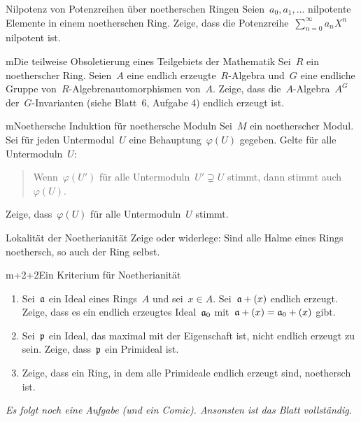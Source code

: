 \documentclass[entwurf]{uebblatt}
\begin{document}

\begin{aufgabe}{2}{Nilpotenz von Potenzreihen über noetherschen Ringen}
Seien~$a_0, a_1, \ldots$ nilpotente Elemente in einem noetherschen Ring. Zeige,
dass die Potenzreihe~$\sum_{n=0}^\infty a_n X^n$ nilpotent ist.
\end{aufgabe}

\begin{aufgabe}{m}{Die teilweise Obsoletierung eines Teilgebiets der Mathematik}
Sei~$R$ ein noetherscher Ring. Seien~$A$ eine
endlich erzeugte~$R$-Algebra und~$G$ eine endliche Gruppe von~$R$-Algebrenautomorphismen
von~$A$. Zeige, dass die~$A$-Algebra~$A^G$ der~$G$-Invarianten (siehe Blatt~6,
Aufgabe 4) endlich erzeugt ist.
\end{aufgabe}

\begin{aufgabe}{m}{Noethersche Induktion für noethersche Moduln}
Sei~$M$ ein noetherscher Modul. Sei für jeden Untermodul~$U$ eine
Behauptung~$\varphi(U)$ gegeben. Gelte für alle Untermoduln~$U$:
\begin{quote}Wenn~$\varphi(U')$ für alle Untermoduln~$U'
\supsetneq U$ stimmt, dann stimmt auch~$\varphi(U)$.\end{quote}
Zeige, dass~$\varphi(U)$ für alle Untermoduln~$U$ stimmt.
\end{aufgabe}

\begin{aufgabe}{2}{Lokalität der Noetherianität}
Zeige oder widerlege: Sind alle Halme eines Rings noethersch, so auch der Ring
selbst.
\end{aufgabe}

\begin{aufgabe}{m+2+2}{Ein Kriterium für Noetherianität}
\begin{enumerate}
\item Sei~$\mathfrak{a}$ ein Ideal eines Rings~$A$ und sei~$x \in A$. Sei~$\mathfrak{a} + (x)$
endlich erzeugt. Zeige, dass es ein endlich erzeugtes Ideal~$\mathfrak{a}_0$ mit~$\mathfrak{a}
+ (x) = \mathfrak{a}_0 + (x)$ gibt.
\item Sei~$\mathfrak{p}$ ein Ideal, das maximal mit der Eigenschaft ist,
nicht endlich erzeugt zu sein. Zeige, dass~$\mathfrak{p}$ ein Primideal ist.
\item Zeige, dass ein Ring, in dem alle Primideale endlich erzeugt sind,
noethersch ist.
\end{enumerate}
\end{aufgabe}

\centering
\emph{Es folgt noch eine Aufgabe (und ein Comic). Ansonsten ist das Blatt
vollständig.}
\par
\end{document}
